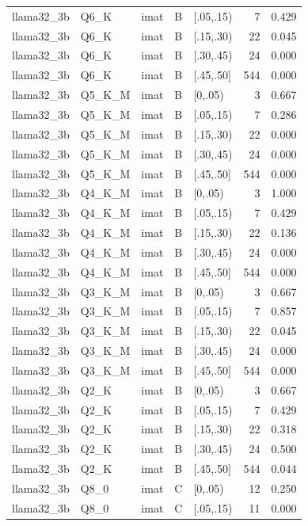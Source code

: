 \begin{tabular}{lllllrr}
llama32\_3b & Q6\_K & imat & B & [.05,.15) & 7 & 0.429 \\
llama32\_3b & Q6\_K & imat & B & [.15,.30) & 22 & 0.045 \\
llama32\_3b & Q6\_K & imat & B & [.30,.45) & 24 & 0.000 \\
llama32\_3b & Q6\_K & imat & B & [.45,.50] & 544 & 0.000 \\
llama32\_3b & Q5\_K\_M & imat & B & [0,.05) & 3 & 0.667 \\
llama32\_3b & Q5\_K\_M & imat & B & [.05,.15) & 7 & 0.286 \\
llama32\_3b & Q5\_K\_M & imat & B & [.15,.30) & 22 & 0.000 \\
llama32\_3b & Q5\_K\_M & imat & B & [.30,.45) & 24 & 0.000 \\
llama32\_3b & Q5\_K\_M & imat & B & [.45,.50] & 544 & 0.000 \\
llama32\_3b & Q4\_K\_M & imat & B & [0,.05) & 3 & 1.000 \\
llama32\_3b & Q4\_K\_M & imat & B & [.05,.15) & 7 & 0.429 \\
llama32\_3b & Q4\_K\_M & imat & B & [.15,.30) & 22 & 0.136 \\
llama32\_3b & Q4\_K\_M & imat & B & [.30,.45) & 24 & 0.000 \\
llama32\_3b & Q4\_K\_M & imat & B & [.45,.50] & 544 & 0.000 \\
llama32\_3b & Q3\_K\_M & imat & B & [0,.05) & 3 & 0.667 \\
llama32\_3b & Q3\_K\_M & imat & B & [.05,.15) & 7 & 0.857 \\
llama32\_3b & Q3\_K\_M & imat & B & [.15,.30) & 22 & 0.045 \\
llama32\_3b & Q3\_K\_M & imat & B & [.30,.45) & 24 & 0.000 \\
llama32\_3b & Q3\_K\_M & imat & B & [.45,.50] & 544 & 0.000 \\
llama32\_3b & Q2\_K & imat & B & [0,.05) & 3 & 0.667 \\
llama32\_3b & Q2\_K & imat & B & [.05,.15) & 7 & 0.429 \\
llama32\_3b & Q2\_K & imat & B & [.15,.30) & 22 & 0.318 \\
llama32\_3b & Q2\_K & imat & B & [.30,.45) & 24 & 0.500 \\
llama32\_3b & Q2\_K & imat & B & [.45,.50] & 544 & 0.044 \\
llama32\_3b & Q8\_0 & imat & C & [0,.05) & 12 & 0.250 \\
llama32\_3b & Q8\_0 & imat & C & [.05,.15) & 11 & 0.000 \\

\end{tabular}
